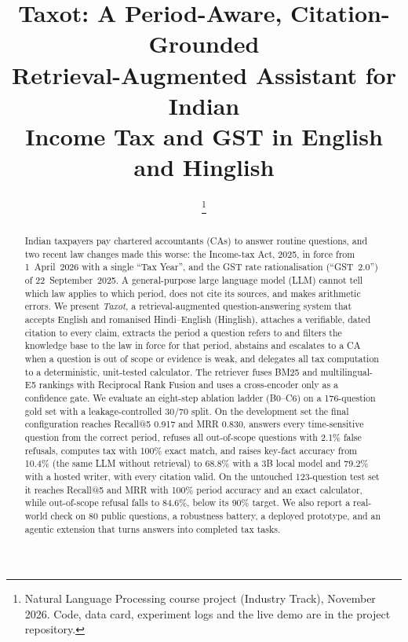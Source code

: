\documentclass[conference]{IEEEtran}
\begin{document}
\title{Taxot: A Period-Aware, Citation-Grounded\\Retrieval-Augmented Assistant for Indian\\Income Tax and GST in English and Hinglish}

\author{
\and
{}
\and
{}
\thanks{Natural Language Processing course project (Industry Track), November 2026. Code, data card, experiment logs and the live demo are in the project repository.}
}

\maketitle

\begin{abstract}
Indian taxpayers pay chartered accountants (CAs) to answer routine questions, and two recent law changes
made this worse: the Income-tax Act, 2025, in force from 1~April~2026 with a single ``Tax Year'', and the
GST rate rationalisation (``GST~2.0'') of 22~September~2025. A general-purpose large language model (LLM)
cannot tell which law applies to which period, does not cite its sources, and makes arithmetic errors. We
present \emph{Taxot}, a retrieval-augmented question-answering system that accepts English and romanised
Hindi--English (Hinglish), attaches a verifiable, dated citation to every claim, extracts the period a
question refers to and filters the knowledge base to the law in force for that period, abstains and
escalates to a CA when a question is out of scope or evidence is weak, and delegates all tax computation to
a deterministic, unit-tested calculator. The retriever fuses BM25 and multilingual-E5 rankings with
Reciprocal Rank Fusion and uses a cross-encoder only as a confidence gate. We evaluate an eight-step
ablation ladder (B0--C6) on a 176-question gold set with a leakage-controlled 30/70 split. On the
development set the final configuration reaches Recall@5 0.917 and MRR 0.830, answers every time-sensitive
question from the correct period, refuses all out-of-scope questions with 2.1\% false refusals, computes
tax with 100\% exact match, and raises key-fact accuracy from 10.4\% (the same LLM without retrieval) to
68.8\% with a 3B local model and 79.2\% with a hosted writer, with every citation valid. On the untouched
123-question test set it reaches Recall@5 \TestRfive{} and MRR \TestMRR{} with 100\% period accuracy and an
exact calculator, while out-of-scope refusal falls to 84.6\%, below its 90\% target. We also report a real-world check
on 80 public questions, a robustness battery, a deployed prototype, and an agentic extension that turns
answers into completed tax tasks.
\end{abstract}
\end{document}
